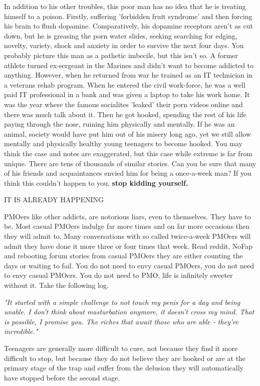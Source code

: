\documentclass[easypeasy]{subfiles}
\begin{document}
In addition to his other troubles, this poor man has no idea that he is treating himself to a poison. Firstly, suffering 'forbidden fruit syndrome' and then forcing his brain to flush dopamine. Comparatively, his dopamine receptors aren't as cut down, but he is greasing the porn water slides, seeking searching for edging, novelty, variety, shock and anxiety in order to survive the next four days. You probably picture this man as a pathetic imbecile, but this isn't so. A former athlete turned ex-sergeant in the Marines and didn't want to become addicted to anything. However, when he returned from war he trained as an IT technician in a veterans rehab program. When he entered the civil work-force, he was a well paid IT professional in a bank and was given a laptop to take his work home. It was the year where the famous socialites 'leaked' their porn videos online and there was much talk about it. Then he got hooked, spending the rest of his life paying through the nose, ruining him physically and mentally. If he was an animal, society would have put him out of his misery long ago, yet we still allow mentally and physically healthy young teenagers to become hooked. You may think the case and notes are exaggerated, but this case while extreme is far from unique. There are tens of thousands of similar stories. Can you be sure that many of his friends and acquaintances envied him for being a once-a-week man? If you think this couldn't happen to you, \textbf{stop kidding yourself.}

{\huge IT IS ALREADY HAPPENING}

PMOers like other addicts, are notorious liars, even to themselves. They have to be. Most casual PMOers indulge far more times and on far more occasions then they will admit to. Many conversations with so called twice-a-week PMOers will admit they have done it more three or four times that week. Read reddit, NoFap and rebooting forum stories from casual PMOers they are either counting the days or waiting to fail. You do not need to envy casual PMOers, you do not need to envy casual PMOers. You do not need to PMO, life is infinitely sweeter without it. Take the following log.

  \textit{"It started with a simple challenge to not touch my penis for a day and being unable. I don't think about masturbation anymore, it doesn't cross my mind. That is possible, I promise you. The riches that await those who are able - they're incredible."}

Teenagers are generally more difficult to cure, not because they find it more difficult to stop, but because they do not believe they are hooked or are at the primary stage of the trap and suffer from the delusion they will automatically have stopped before the second stage.
\end{document}
